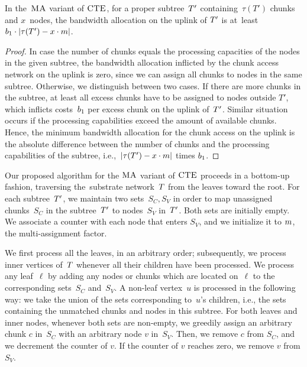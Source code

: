 

\begin{lemma}\label{lem:uplink-alloc}
In the~$\textsc{MA}$ variant of $\textsc{CTE}$, for a proper subtree~$T'$
containing~$\tau(T')$
chunks and $x$~nodes, the bandwidth allocation on the uplink of $T'$ is at~least ${b_1\cdot|\tau(T')-x\cdot m|}$.
\label{lemma:uplink}
\end{lemma}
\begin{proof}
In case the number of chunks equals the processing capacities of the
nodes in the given subtree,
the bandwidth allocation inflicted by the chunk access network on the uplink is zero, since we can assign all chunks to nodes in the same subtree.
Otherwise, we distinguish between two cases. If there are more chunks in the subtree, at least all excess chunks have to
be assigned to nodes outside $T'$, which 
inflicts costs~$b_1$ per excess chunk on the uplink of~$T'$.
 Similar situation occurs if the processing capabilities exceed the
amount of
available chunks.
Hence, the minimum bandwidth allocation for the chunk access on the uplink
is the absolute difference between the number of chunks and the processing capabilities
of the subtree, i.e.,~$|\tau(T')-x\cdot m|$ times $b_1$.
\end{proof}


 Our proposed algorithm for the $\textsc{MA}$ variant of $\textsc{CTE}$
proceeds in a bottom-up fashion, traversing the~substrate network~$T$
from the leaves toward the root.
For each subtree~$T'$, we maintain
two sets~$S_C,S_V$ in order to map unassigned
chunks~$S_C$ in the subtree~$T'$ to 
nodes~$S_V$ in~$T'$. Both sets are initially empty.
We associate a counter with each node that enters $S_V$, and we initialize it to $m$, the multi-assignment factor.


We first process all the leaves, in an arbitrary order; subsequently, we process inner vertices
of~$T$ whenever all their children have been processed.
We process any leaf~$\ell$
by adding any
nodes or chunks which are located on~$\ell$ to the corresponding sets~$S_C$ and~$S_V$.
A non-leaf vertex~$u$ is processed in the following way: we take the union of
the sets corresponding to~$u$'s children, i.e., the sets containing the unmatched chunks and nodes
in this subtree.
For both leaves and inner nodes, whenever
both sets are non-empty, we greedily assign an arbitrary chunk $c$ in~$S_C$ with an arbitrary node $v$ in~$S_V$.
Then, we remove $c$ from $S_C$, and we decrement the counter of $v$. If the counter of $v$ reaches zero, we remove $v$ from $S_V$.

